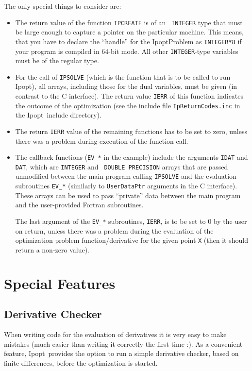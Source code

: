 \documentclass[10pt]{article}
\newcommand{\Ipopt}{{\sc Ipopt}}
\begin{document}
The only special things to consider are:
\begin{itemize}
\item The return value of the function {\tt IPCREATE} is of an {\tt
    INTEGER} type that must be large enough to capture a pointer
  on the particular machine.  This means, that you have to declare
  the ``handle'' for the IpoptProblem as {\tt INTEGER*8} if your
  program is compiled in 64-bit mode.  All other {\tt INTEGER}-type
  variables must be of the regular type.
\item For the call of {\tt IPSOLVE} (which is the function that is to
  be called to run \Ipopt), all arrays, including those for the dual
  variables, must be given (in contrast to the C interface).  The
  return value {\tt IERR} of this function indicates the outcome of
  the optimization (see the include file {\tt IpReturnCodes.inc} in
  the \Ipopt\ include directory).
\item The return {\tt IERR} value of the remaining functions has to be
  set to zero, unless there was a problem during execution of the
  function call.
\item The callback functions ({\tt EV\_*} in the example) include the
  arguments {\tt IDAT} and {\tt DAT}, which are {\tt INTEGER} and {\tt
    DOUBLE PRECISION} arrays that are passed unmodified between the
  main program calling {\tt IPSOLVE} and the evaluation subroutines
  {\tt EV\_*} (similarly to {\tt UserDataPtr} arguments in the C
  interface).  These arrays can be used to pass ``private'' data
  between the main program and the user-provided Fortran subroutines.

  The last argument of the {\tt EV\_*} subroutines, {\tt IERR}, is to
  be set to 0 by the user on return, unless there was a problem
  during the evaluation of the optimization problem
  function/derivative for the given point {\tt X} (then it should
  return a non-zero value).
\end{itemize}

\section{Special Features}
\subsection{Derivative Checker}\label{sec:deriv-checker}
When writing code for the evaluation of derivatives it is very easy to
make mistakes (much easier than writing it correctly the first time
:).  As a convenient feature, \Ipopt\ provides the option to run a
simple derivative checker, based on finite differences, before the
optimization is started.
\end{document}
